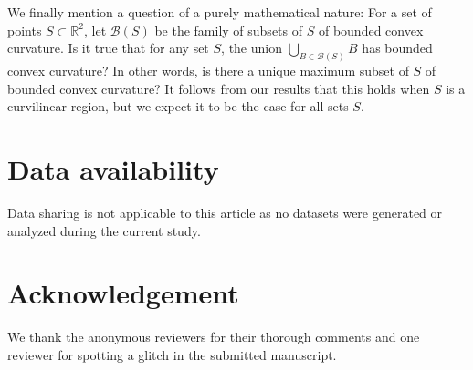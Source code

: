 \documentclass{article}
\newcommand{\RR}{\mathbb R}
\begin{document}
We finally mention a question of a purely mathematical nature:
For a set of points $S\subset\RR^2$, let $\mathcal B(S)$ be the family of subsets of $S$ of bounded convex curvature.
Is it true that for any set $S$, the union $\bigcup_{B\in\mathcal B(S)} B$ has bounded convex curvature?
In other words, is there a unique maximum subset of $S$ of bounded convex curvature?
It follows from our results that this holds when $S$ is a curvilinear region, but we expect it to be the case for all sets $S$.

\section{Data availability}

Data sharing is not applicable to this article as no datasets were generated or analyzed during the current study.

\section*{Acknowledgement}

We thank the anonymous reviewers for their thorough comments and one reviewer for spotting a glitch in the submitted manuscript.

{}
\end{document}
